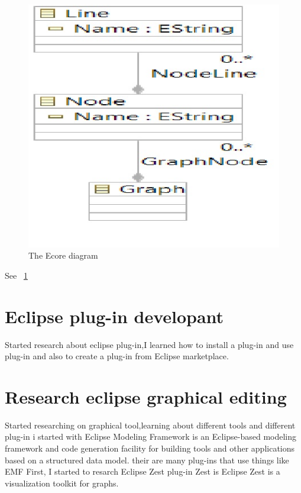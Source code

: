 \documentclass{article}
\begin{document}
\begin{figure}[htp]
\centering
\includegraphics[width=1\linewidth]{Ecore diagram.jpg}
\caption{The Ecore diagram}
\label{threadsVsSync}
\end{figure}

See \figurename~\ref{threadsVsSync}

\section{Eclipse plug-in developant}

Started research about eclipse plug-in,I learned how to install a plug-in and use plug-in and also to create a plug-in from Eclipse marketplace.

\section{Research eclipse graphical editing}
Started researching on graphical tool,learning about different tools and different plug-in i started with Eclipse Modeling Framework is an Eclipse-based modeling framework and code generation facility for building tools and other applications based on a structured data model. their are many plug-ins that use things like EMF First, I started to resarch Eclipse Zest plug-in Zest is Eclipse Zest is a visualization toolkit for graphs.
\end{document}
